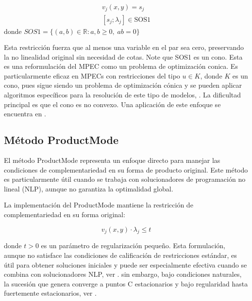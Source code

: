 \begin{equation}\label{eq:SOS1_reform}\begin{matrix}v_j(x,y)=s_j\\
[s_j; \lambda_j] \in \text{SOS1} \end{matrix}
\end{equation}
 donde $SOS1=\{(a,b)\in \mathbb{R}: a,b\geq 0,\; ab=0\}$


Esta restricción fuerza que al menos una variable en el par sea cero, preservando la no linealidad original sin necesidad de cotas. Note que SOS1 es un cono. Esta es una reformulación del  MPEC como un problema de optimización conica. Es particularmente eficaz en MPECs con restricciones del tipo $u\in K$, donde $K$ es un cono, pues sigue siendo un problema de optimización cónica  y se pueden aplicar algoritmos específicos para la resolución de este tipo de modelos, \cite{BilevelJump}. La dificultad principal es que el cono es no convexo. Una aplicación de este enfoque se encuentra en \cite{SadddiquiNaturalGasSOS1}.


\subsection{Método ProductMode}

El método ProductMode representa un enfoque directo para manejar las condiciones de complementariedad en su forma de producto original. Este método es particularmente útil cuando se trabaja con solucionadores de programación no lineal (NLP), aunque no garantiza la optimalidad global.

La implementación del ProductMode mantiene la restricción de complementariedad en su forma original:

\begin{equation}
    v_j(x,y) \cdot \lambda_j \leq t \label{eq:ProductMode_reg}
\end{equation}

donde $t > 0$ es un parámetro de regularización pequeño. Esta formulación, aunque no satisface las condiciones de calificación de restricciones estándar, es útil para obtener soluciones iniciales y puede ser especialmente efectiva cuando se combina con solucionadores NLP, ver \cite{BilevelJump}. sin embargo, bajo condiciones naturales, la sucesión que genera converge a puntos C  estacionarios y bajo regularidad hasta fuertemente estacionarios, ver \cite{scholtes12}.  



